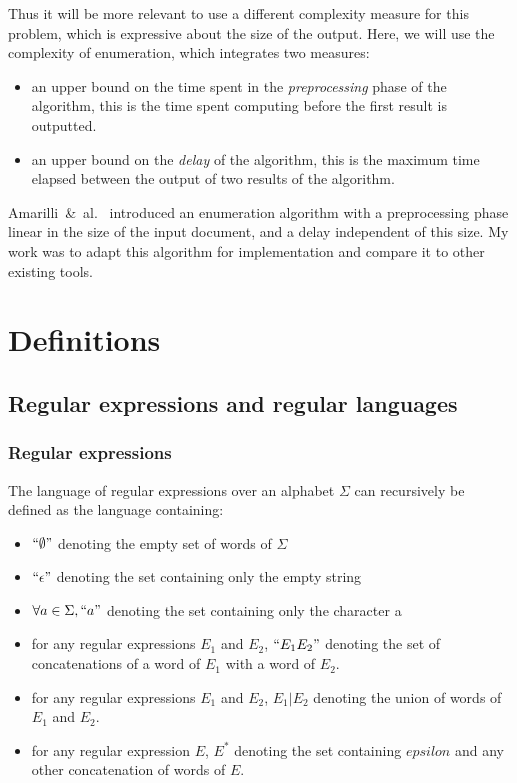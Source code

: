 \documentclass[12px]{article}
\begin{document}
    Thus it will be more relevant to use a different complexity measure for
    this problem, which is expressive about the size of the output. Here, we
    will use the complexity of enumeration, which integrates two measures:

    \begin{itemize}
      \item an upper bound on the time spent in the \textit{preprocessing}
        phase of the algorithm, this is the time spent computing before the
        first result is outputted.
      \item an upper bound on the \textit{delay} of the algorithm, this is
        the maximum time elapsed between the output of two results of the
        algorithm.
    \end{itemize}

    Amarilli~\&~al.~\cite{ICDT19} introduced an enumeration algorithm with a
    preprocessing phase linear in the size of the input document, and a delay
    independent of this size. My work was to adapt this algorithm for
    implementation and compare it to other existing tools.


  \section{Definitions}

    \subsection{Regular expressions and regular languages}

      \subsubsection{Regular expressions}

        The language of regular expressions over an alphabet $\Sigma$ can
        recursively be defined as the language containing:

        \begin{itemize}
          \item $``\emptyset"$ denoting the empty set of words of $\Sigma$
          \item $``\epsilon"$ denoting the set containing only the empty string
          \item $\forall a \in \Sigma, ``a"$ denoting the set
            containing only the character a
          \item for any regular expressions $E_1$ and $E_2$, $``E_1 E_2"$
            denoting the set of concatenations of a word of $E_1$ with a word
            of $E_2$.
          \item for any regular expressions $E_1$ and $E_2$, $E_1|E_2$
            denoting the union of words of $E_1$ and $E_2$.
          \item for any regular expression $E$, $E^*$ denoting the set
            containing $epsilon$ and any other concatenation of words of $E$.
        \end{itemize}
\end{document}
